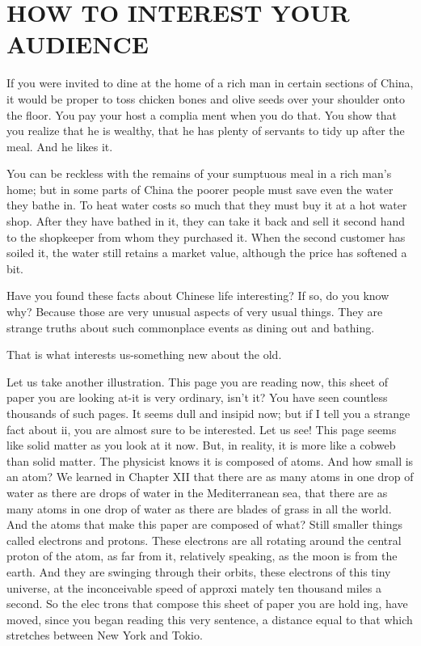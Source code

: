 \documentclass[10pt]{article}
\begin{document}
\section*{HOW TO INTEREST YOUR AUDIENCE}
If you were invited to dine at the home of a rich man in certain sections of China, it would be proper to toss chicken bones and olive seeds over your shoulder onto the floor. You pay your host a complia ment when you do that. You show that you realize that he is wealthy, that he has plenty of servants to tidy up after the meal. And he likes it.

You can be reckless with the remains of your sumptuous meal in a rich man's home; but in some parts of China the poorer people must save even the water they bathe in. To heat water costs so much that they must buy it at a hot water shop. After they have bathed in it, they can take it back and sell it second hand to the shopkeeper from whom they purchased it. When the second customer has soiled it, the water still retains a market value, although the price has softened a bit.

Have you found these facts about Chinese life interesting? If so, do you know why? Because those are very unusual aspects of very usual things. They are strange truths about such commonplace events as dining out and bathing.

That is what interests us-something new about the old.

Let us take another illustration. This page you are reading now, this sheet of paper you are looking at-it is very ordinary, isn't it? You have seen countless thousands of such pages. It seems dull and insipid now; but if I tell you a strange fact about ii, you are almost sure to be interested. Let us see! This page seems like solid matter as you look at it now. But, in reality, it is more like a cobweb than solid matter. The physicist knows it is composed of atoms. And how small is an atom? We learned in Chapter XII that there are as many atoms in one drop of water as there are drops of water in the Mediterranean sea, that there are as many atoms in one drop of water as there are blades of grass in all the world. And the atoms that make this paper are composed of what? Still smaller things called electrons and protons. These electrons are all rotating around the central proton of the atom, as far from it, relatively speaking, as the moon is from the earth. And they are swinging through their orbits, these electrons of this tiny universe, at the inconceivable speed of approxi mately ten thousand miles a second. So the elec trons that compose this sheet of paper you are hold ing, have moved, since you began reading this very sentence, a distance equal to that which stretches between New York and Tokio.
\end{document}
